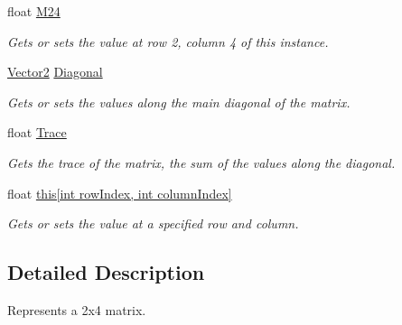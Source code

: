 \begin{DoxyCompactItemize}
float \hyperlink{struct_open_t_k_1_1_matrix2x4_aad29e542021412a7935ad208b41f5b3f}{M24}
\begin{DoxyCompactList}\small\item\em Gets or sets the value at row 2, column 4 of this instance. \end{DoxyCompactList}\item 
\hyperlink{struct_open_t_k_1_1_vector2}{Vector2} \hyperlink{struct_open_t_k_1_1_matrix2x4_a44f6f077bf540d62c60bc37d50726c1e}{Diagonal}
\begin{DoxyCompactList}\small\item\em Gets or sets the values along the main diagonal of the matrix. \end{DoxyCompactList}\item 
float \hyperlink{struct_open_t_k_1_1_matrix2x4_afe6fd0f69b274994ab761676abe6aa2f}{Trace}
\begin{DoxyCompactList}\small\item\em Gets the trace of the matrix, the sum of the values along the diagonal. \end{DoxyCompactList}\item 
float \hyperlink{struct_open_t_k_1_1_matrix2x4_a980938d7d213208b12e2de4671099b80}{this\mbox{[}int row\-Index, int column\-Index\mbox{]}}
\begin{DoxyCompactList}\small\item\em Gets or sets the value at a specified row and column. \end{DoxyCompactList}\end{DoxyCompactItemize}


\subsection{Detailed Description}
Represents a 2x4 matrix. 



